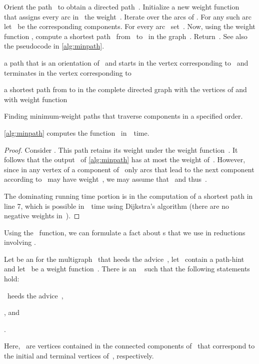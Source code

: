 Orient the path~ to obtain a directed path~. Initialize a new weight function~ that assigns every arc in~ the weight~. Iterate over the arcs of . For any such arc~ let~ be the corresponding components. For every arc~ set~. Now, using the weight function , compute a shortest path~ from~ to~ in the graph~. Return~. See also the pseudocode in \autoref{alg:minpath}.
\begin{algorithm}
  \LinesNumbered
  


  \BlankLine
   a path that is an orientation of~ and starts in the vertex corresponding to~ and terminates in the vertex corresponding to~\;

  \lFor{}{\;}
   a shortest path from  to  in the complete directed graph with the vertices of  and with weight function \;
  
  \Return{\npath\;}
    
  \caption{Finding minimum-weight paths that traverse components in a specified order.}
  \label{alg:minpath}
\end{algorithm}
\begin{lemma}
  \label{lem:minpath}
  \autoref{alg:minpath} computes the function~ in~~time.
\end{lemma}
\begin{proof}
  Consider . This path retains its weight under the weight function~. It follows that the output~ of \autoref{alg:minpath} has at most the weight of~. However, since in any vertex of a component of~ only arcs that lead to the next component according to~ may have weight~, we may assume that~ and thus~.

  The dominating running time portion is in the computation of a shortest path in line 7, which is possible in~~time using Dijkstra's algorithm (there are no negative weights in~).
\end{proof}
Using the~ function, we can formulate a fact about \EE s that we use in reductions involving \pWMEEAs{}.
\begin{observation}\label{obs:minpathinee}
  Let  be an \EE{} for the multigraph~ that heeds the advice~, let~ contain a path-hint~ and let~ be a weight function~. There is an \EE{}~ such that the following statements hold:
  \begin{lemenum}
  \item ~heeds the advice~,
  \item , and 
  \item .
  \end{lemenum}
  Here,~ are vertices contained in the connected components of~ that correspond to the initial and terminal vertices of~, respectively.
\end{observation}
